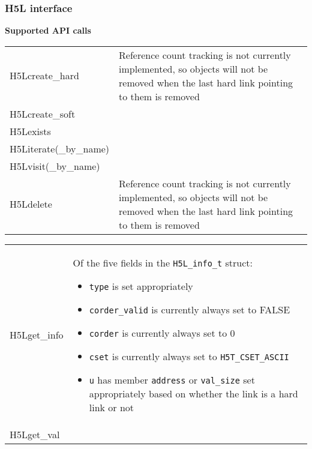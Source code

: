 \documentclass[../users_guide.tex]{subfiles}
\begin{document}
\newpage

\subsubsection{H5L interface}

\begin{center}

\textbf{Supported API calls}
\vspace{.2in} \\

\begin{tabularx}{\linewidth}{| X | >{\RaggedRight}X |}
\hline
\rowcolor{lightgray!50}%
\multicolumn{1}{| c |}{\textbf{API call}} & \multicolumn{1}{c |}{\textbf{Notes}} \\ \hline

H5Lcreate\_hard & Reference count tracking is not currently implemented, so objects will not be removed when the last hard link pointing to them is removed\\ \hline
H5Lcreate\_soft & \\ \hline
H5Lexists & \\ \hline
H5Literate(\_by\_name) & \\ \hline
H5Lvisit(\_by\_name) & \\ \hline
H5Ldelete & Reference count tracking is not currently implemented, so objects will not be removed when the last hard link pointing to them is removed\\ \hline

\end{tabularx}

\begin{tabularx}{\linewidth}{| X | >{\RaggedRight}X |}
\hline
\rowcolor{lightgray!50}%
\multicolumn{1}{| c |}{\textbf{API call}} & \multicolumn{1}{c |}{\textbf{Notes}} \\ \hline

H5Lget\_info & Of the five fields in the \texttt{H5L\_info\_t} struct:
                                     \begin{itemize}
                                         \item \texttt{type} is set appropriately
                                         \item \texttt{corder\_valid} is currently always set to FALSE
                                         \item \texttt{corder} is currently always set to 0
                                         \item \texttt{cset} is currently always set to \texttt{H5T\_CSET\_ASCII}
                                         \item \texttt{u} has member \texttt{address} or \texttt{val\_size} set appropriately based on whether the link is a hard link or not
                                     \end{itemize}\\ \hline
H5Lget\_val & \\ \hline


\end{tabularx}
\end{center}
\end{document}
